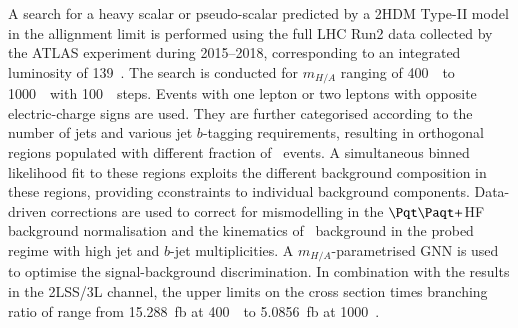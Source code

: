 %

A search for a heavy scalar or pseudo-scalar predicted by a 2HDM Type-II model in the allignment limit is performed
using the full LHC Run2 data collected by the ATLAS experiment during 2015--2018,
corresponding to an integrated luminosity of 139~\ifb.
The search is conducted for $m_{H/A}$ ranging of 400~\GeV\ to 1000~\GeV\ with 100~\GeV\ steps.
Events with one lepton or two leptons with opposite electric-charge signs are used.
They are further categorised according to the number of jets and various jet $b$-tagging requirements,
resulting in orthogonal regions populated with different fraction of \ttjets\ events.
A simultaneous binned likelihood fit to these regions exploits the different background composition in these regions,
providing cconstraints to individual background components.
Data-driven corrections are used to correct for mismodelling in the $\ttbar+$HF background normalisation
and the kinematics of \ttjets\ background in the probed regime with high jet and $b$-jet multiplicities.
A $m_{H/A}$-parametrised GNN is used to optimise the signal-background discrimination.
In combination with the results in the 2LSS/3L channel,
the upper limits on the cross section times branching ratio of \ttHA
range from 15.288~fb at 400~\GeV\ to 5.0856~fb at 1000~\GeV.
